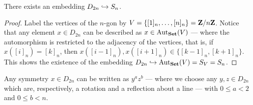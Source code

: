 \begin{proposition}\label{prop: dihetral-to-sym}
There exists an embedding \(D_{2n} \hookrightarrow S_n\).
\end{proposition}

\begin{proof}
Label the vertices of the \(n\)-gon by \(V = \{[1]_n, \dots, [n]_n\} =
\mathbf{Z}/n\mathbf{Z}\). Notice that any element \(x \in D_{2n}\) can be described as \(x \in
\operatorname{Aut}_{\textbf{Set}}(V)\) --- where the automorphism is restricted to the adjacency of
the vertices, that is, if \(x([i]_n) = [k]_n\), then \(x([i - 1]_n), x([i +
1]_n) \in \{[k - 1]_n, [k + 1]_n\}\). This shows the existence of the
embedding \(D_{2n} \hookrightarrow \operatorname{Aut}_{\textbf{Set}}(V) = S_V = S_n\).
\end{proof}

\begin{proposition}
Any symmetry \(x \in D_{2n}\) can be written as \(y^a z^b\) --- where we
choose any \(y, z \in D_{2n}\) which are, respectively, a rotation and a
reflection about a line --- with \(0 \leq a < 2\) and \(0 \leq b < n\).
\end{proposition}


